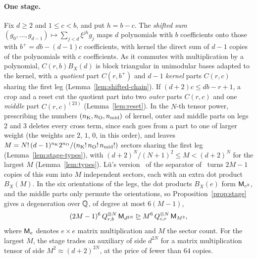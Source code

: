 \paragraph{One stage.}
Fix \(d\ge2\) and \(1\le c<b\), and put \(h=b-c\). The \emph{shifted
sum} \((g_0,\ldots,g_{d-1})\mapsto\sum_{j<d}\xi^{jh}g_j\) maps \(d\)
polynomials with \(b\) coefficients onto those with \(b^+=db-(d-1)c\)
coefficients, with kernel the direct sum of \(d-1\) copies of the
polynomials with \(c\) coefficients. As it commutes with multiplication
by a polynomial, \(C(r,b)B_X(d)\) is block triangular in unimodular
bases adapted to the kernel, with a \emph{quotient} part \(C(r,b^+)\)
and \(d-1\) \emph{kernel} parts \(C(r,c)\) sharing the first leg
(Lemma~\ref{lem:shifted-chain}). If \((d+2)c\le db-r+1\), a crop and a
reset cut the quotient part into two \emph{outer} parts \(C(r,c)\) and
one \emph{middle} part \(C(r,c)^{(23)}\) (Lemma~\ref{lem:reset}). In the
\(N\)-th tensor power, prescribing the numbers \((n_{\mathrm K},n_{\mathrm O},n_{\mathrm{mid}})\) of
kernel, outer and middle parts on legs \(2\) and \(3\) deletes every
cross term, since each goes from a part to one of larger weight (the
weights are \(2\), \(1\), \(0\), in this order), and leaves
\(M=N!\,(d-1)^{n_{\mathrm K}}2^{n_{\mathrm O}}/(n_{\mathrm K}!\,n_{\mathrm O}!\,n_{\mathrm{mid}}!)\) sectors sharing the
first leg (Lemma~\ref{lem:stage-types}), with
\((d+2)^N/(N+1)^2\le M<(d+2)^N\) for the largest \(M\)
(Lemma~\ref{lem:types}). L\"u's version~\citep{Lu26} of the separator
of~\citet{OAI26} turns \(2M-1\) copies of this sum into \(M\) independent sectors, each with an extra
dot product \(B_X(M)\). In the six orientations of the legs, the dot
products \(B_X(e)\) form \(\mathsf M_{e^2}\), and the middle parts only
permute the orientations, so Proposition~\ref{prop:stage} gives a
degeneration over \(\mathbb Q\), of degree at most \(6(M-1)\),
\[
 (2M-1)^6\,Q_{r,b}^{\otimes N}\,\mathsf M_{d^{2N}}\unrhd
 M^6\,Q_{c,r}^{\otimes N}\,\mathsf M_{M^2} ,
\]
where \(\mathsf M_e\) denotes \(e\times e\) matrix multiplication and \(M\)
the sector count. For the largest \(M\), the stage trades an auxiliary
of side \(d^{2N}\) for a matrix multiplication tensor of side \(M^2\approx(d+2)^{2N}\), at
the price of fewer than \(64\) copies.

